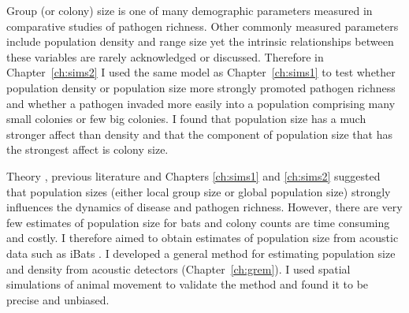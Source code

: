 
Group (or colony) size is one of many demographic parameters measured in comparative studies of pathogen richness.
Other commonly measured parameters include population density and range size \cite{kamiya2014determines, nunn2003comparative, morand1998density, lindenfors2007parasite, gay2014parasite, ezenwa2006host} yet the intrinsic relationships between these variables are rarely acknowledged or discussed.
Therefore in Chapter~\ref{ch:sims2} I used the same model as Chapter~\ref{ch:sims1} to test whether population density or population size more strongly promoted pathogen richness and whether a pathogen invaded more easily into a population comprising many small colonies or few big colonies.
I found that population size has a much stronger affect than density and that the component of population size that has the strongest affect is colony size.



Theory \cite{may1979population, anderson1979population}, previous literature \cite{kamiya2014determines, nunn2003comparative, morand1998density} and Chapters \ref{ch:sims1} and \ref{ch:sims2} suggested that population sizes (either local group size or global population size) strongly influences the dynamics of disease and pathogen richness.
However, there are very few estimates of population size for bats and colony counts are time consuming and costly.
I therefore aimed to obtain estimates of population size from acoustic data such as iBats \cite{jones2011indicator}.
I developed a general method for estimating population size and density from acoustic detectors (Chapter~\ref{ch:grem}).
I used spatial simulations of animal movement to validate the method and found it to be precise and unbiased.

